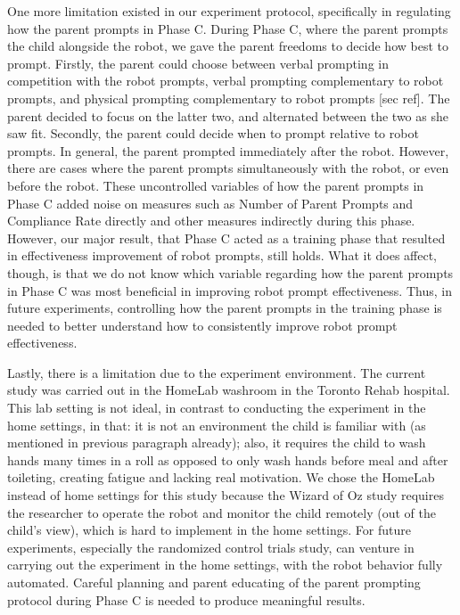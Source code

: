 One more limitation existed in our experiment protocol, specifically in regulating how the parent prompts in Phase C.  During Phase C, where the parent prompts the child alongside the robot, we gave the parent freedoms to decide how best to prompt.  Firstly, the parent could choose between verbal prompting in competition with the robot prompts, verbal prompting complementary to robot prompts, and physical prompting complementary to robot prompts [sec ref].  The parent decided to focus on the latter two, and alternated between the two as she saw fit.  Secondly, the parent could decide when to prompt relative to robot prompts.  In general, the parent prompted immediately after the robot.  However, there are cases where the parent prompts simultaneously with the robot, or even before the robot.  These uncontrolled variables of how the parent prompts in Phase C added noise on measures such as Number of Parent Prompts and Compliance Rate directly and other measures indirectly during this phase.  However, our major result, that Phase C acted as a training phase that resulted in effectiveness improvement of robot prompts, still holds.  What it does affect, though, is that we do not know which variable regarding how the parent prompts in Phase C was most beneficial in improving robot prompt effectiveness.  Thus, in future experiments, controlling how the parent prompts in the training phase is needed to better understand how to consistently improve robot prompt effectiveness.

Lastly, there is a limitation due to the experiment environment.  The current study was carried out in the HomeLab washroom in the Toronto Rehab hospital.  This lab setting is not ideal, in contrast to conducting the experiment in the home settings, in that: it is not an environment the child is familiar with (as mentioned in previous paragraph already); also, it requires the child to wash hands many times in a roll as opposed to only wash hands before meal and after toileting, creating fatigue and lacking real motivation.  We chose the HomeLab instead of home settings for this study because the Wizard of Oz study requires the researcher to operate the robot and monitor the child remotely (out of the child's view), which is hard to implement in the home settings.  For future experiments, especially the randomized control trials study, can venture in carrying out the experiment in the home settings, with the robot behavior fully automated.  Careful planning and parent educating of the parent prompting protocol during Phase C is needed to produce meaningful results.

